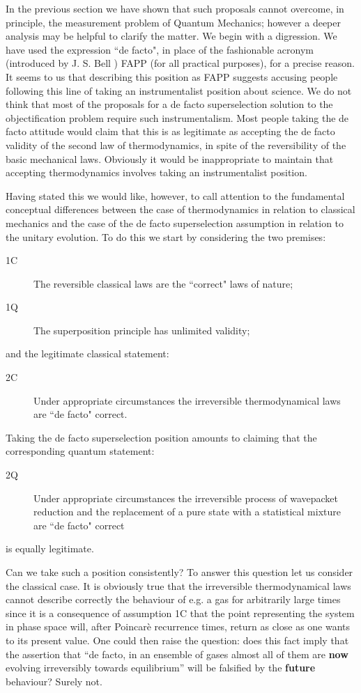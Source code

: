 \documentclass[10pt,a4paper]{article}
\begin{document}
In the previous section we have shown that such proposals cannot
overcome, in principle, the measurement problem of Quantum
Mechanics; however  a deeper analysis may be helpful to clarify
the matter. We begin with a digression. We have used the
expression ``de facto", in place of the fashionable acronym
(introduced by J. S. Bell \cite{bellam}) FAPP (for all practical
purposes), for a precise reason. It seems to us that describing
this position as FAPP suggests accusing people following this line
of taking an instrumentalist position about science. We do not
think that most of the proposals for a de facto superselection
solution to the objectification problem require such
instrumentalism. Most people taking the de facto attitude would
claim that this is as legitimate as accepting the de facto
validity of the second law of thermodynamics, in spite of the
reversibility of the basic mechanical laws. Obviously it would be
inappropriate to maintain that accepting thermodynamics involves
taking an instrumentalist position.

Having stated this we would like, however, to call attention to
the fundamental conceptual differences between the case of
thermodynamics in relation to classical mechanics and the case of
the de facto superselection assumption in relation to the unitary
evolution. To do this we start by considering the two premises:
\begin{description}
\item[1C] The reversible classical laws are the ``correct" laws
of nature;
\item[1Q] The superposition principle has unlimited validity;
\end{description}
and the legitimate classical statement:
\begin{description}
\item[2C] Under appropriate circumstances the irreversible
thermodynamical laws are ``de facto" correct.
\end{description}
Taking the de facto superselection position amounts to claiming
that the corresponding quantum statement:
\begin{description}
\item[2Q] Under appropriate circumstances the irreversible
process of wavepacket reduction and the replacement of a pure
state with a statistical mixture are ``de facto" correct
\end{description}
is equally legitimate.

Can we take such a position consistently? To answer this question
let us consider the classical case. It is obviously true that the
irreversible thermodynamical laws cannot describe correctly the
behaviour of e.g. a gas for arbitrarily large times since it is a
consequence of assumption 1C that the point representing the
system in phase space will, after Poincar\`e recurrence times,
return as close as one wants to its present value. One could then
raise the question: does this fact imply that the assertion that
``de facto, in an ensemble of gases almost all of them are {\bf
now} evolving irreversibly towards equilibrium'' will be falsified
by the {\bf future} behaviour? Surely not.
\end{document}
